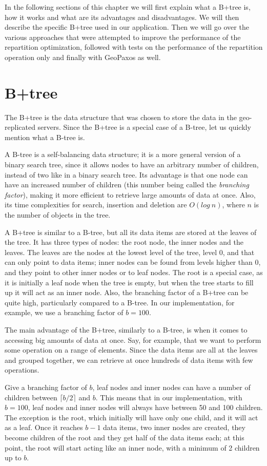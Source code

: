 In the following sections of this chapter we will first explain what a B+tree is, how it works and what are its advantages and disadvantages. We will then describe the specific B+tree used in our application. Then we will go over the various approaches that were attempted to improve the performance of the repartition optimization, followed with tests on the performance of the repartition operation only and finally with GeoPaxos as well.

\section{B+tree}\label{sec:B+tree}
The B+tree is the data structure that was chosen to store the data in the geo-replicated servers. Since the B+tree is a special case of a B-tree, let us quickly mention what a B-tree is.

A B-tree is a self-balancing data structure; it is a more general version of a binary search tree, since it allows nodes to have an arbitrary number of children, instead of two like in a binary search tree. Its advantage is that one node can have an increased number of children (this number being called the \emph{branching factor}), making it more efficient to retrieve large amounts of data at once. Also, its time complexities for search, insertion and deletion are $O(log\ n)$, where $n$ is the number of objects in the tree.

A B+tree is similar to a B-tree, but all its data items are stored at the leaves of the tree. It has three types of nodes: the root node, the inner nodes and the leaves. The leaves are the nodes at the lowest level of the tree, level 0, and that can only point to data items; inner nodes can be found from levels higher than 0, and they point to other inner nodes or to leaf nodes. The root is a special case, as it is initially a leaf node when the tree is empty, but when the tree starts to fill up it will act as an inner node. Also, the branching factor of a B+tree can be quite high, particularly compared to a B-tree. In our implementation, for example, we use a branching factor of $b=100$.

The main advantage of the B+tree, similarly to a B-tree, is when it comes to accessing big amounts of data at once. Say, for example, that we want to perform some operation on a range of elements. Since the data items are all at the leaves and grouped together, we can retrieve at once hundreds of data items with few operations.

Give a branching factor of $b$, leaf nodes and inner nodes can have a number of children between $\lceil b/2 \rceil$ and $b$. This means that in our implementation, with $b=100$, leaf nodes and inner nodes will always have between 50 and 100 children. The exception is the root, which initially will have only one child, and it will act as a leaf. Once it reaches $b-1$ data items, two inner nodes are created, they become children of the root and they get half of the data items each; at this point, the root will start acting like an inner node, with a minimum of 2 children up to $b$.

